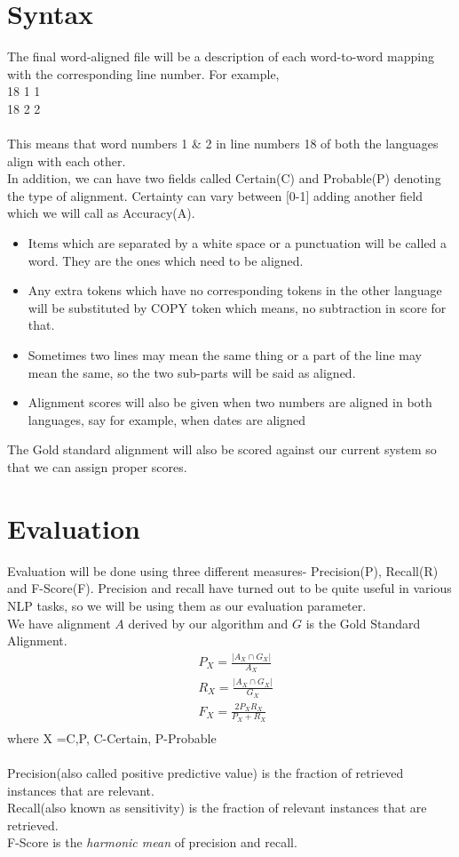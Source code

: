 \documentclass{article}
\begin{document}
\section{Syntax}
The final word-aligned file will be a description of each word-to-word mapping with the corresponding line number. For example,\\
18 1 1\\
18 2 2\\\\
This means that word numbers 1 \& 2 in line numbers 18 of both the languages align with each other.\\
In addition, we can have two fields called Certain(C) and Probable(P) denoting the type of alignment. Certainty can vary between [0-1] adding another field which we will call as Accuracy(A).\\
\begin{itemize}
\item Items which are separated by a white space or a punctuation will be called a word. They are the ones which need to be aligned.
\item Any extra tokens which have no corresponding tokens in the other language will be substituted by COPY token which means, no subtraction in score for that.
\item Sometimes two lines may mean the same thing or a part of the line may mean the same, so the two sub-parts will be said as aligned.
\item Alignment scores will also be given when two numbers are aligned in both languages, say for example, when dates are aligned
\end{itemize}
The Gold standard alignment will also be scored against our current system so that we can assign proper scores.

\section{Evaluation}
Evaluation will be done using three different measures- Precision(P), Recall(R) and F-Score(F). Precision and recall have turned out to be quite useful in various NLP tasks, so we will be using them as our evaluation parameter.\\
We have alignment $A$ derived by our algorithm and $G$ is the Gold Standard Alignment.
\begin{align*}
&P_X=\frac{|A_X \cap G_X|}{A_X}\\
&R_X=\frac{|A_X \cap G_X|}{G_X}\\
&F_X=\frac{2P_XR_X}{P_X+R_X}\\
\end{align*}
where X ={C,P}, C-Certain, P-Probable\\\\
Precision(also called positive predictive value) is the fraction of retrieved instances that are relevant.\\
Recall(also known as sensitivity) is the fraction of relevant instances that are retrieved.\\
F-Score is the \emph{harmonic mean} of precision and recall.
\end{document}
